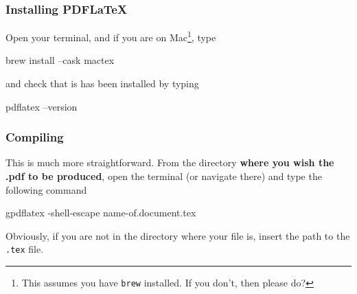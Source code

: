 \documentclass{article}
\begin{document}
\subsubsection{Installing PDFLaTeX}
Open your terminal, and if you are on Mac\footnote{This assumes you have \texttt{brew} installed. If you don't, then please do?}, type 
\begin{bashcode}
    brew install --cask mactex
 \end{bashcode}
 and check that is has been installed by typing 
 \begin{bashcode}
    pdflatex --version
\end{bashcode}
\subsubsection{Compiling}
This is much more straightforward. From the directory \textbf{where you wish the .pdf to be produced}, open the terminal (or navigate there) and type the following command
\begin{bashcode}
    gpdflatex -shell-escape name-of.document.tex
\end{bashcode}
Obviously, if you are not in the directory where your file is, insert the path to the \texttt{.tex} file.
\newpage
\end{document}
